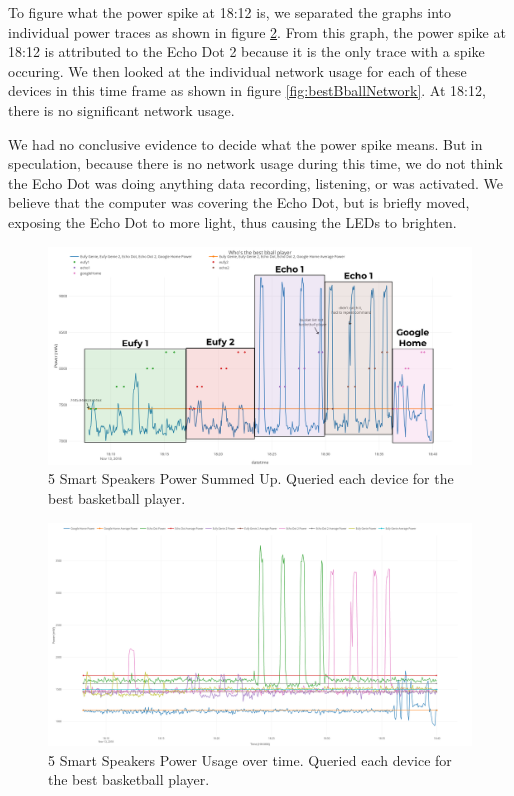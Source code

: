 To figure what the power spike at 18:12 is, we separated the graphs into individual power traces as shown in figure \ref{fig:bestBballSeperate}. From this graph, the power spike at 18:12 is attributed to the Echo Dot 2 because it is the only trace with a spike occuring. We then looked at the individual network usage for each of these devices in this time frame as shown in figure \ref{fig:bestBballNetwork}. At 18:12, there is no significant network usage.

We had no conclusive evidence to decide what the power spike means. But in speculation, because there is no network usage during this time, we do not think the Echo Dot was doing anything data recording, listening, or was activated. We believe that the computer was covering the Echo Dot, but is briefly moved, exposing the Echo Dot to more light, thus causing the LEDs to brighten.

\begin{figure}[H]
  \centering
  \includegraphics[width=1\textwidth]{figures/bestBballSum.png}
  \caption{5 Smart Speakers Power Summed Up. Queried each device for the
  best basketball player.}
  \label{fig:bestBballSum}
\end{figure}

\begin{figure}[H]
  \centering
  \includegraphics[width=1\textwidth]{figures/bestBballSeperate.png}
  \caption{5 Smart Speakers Power Usage over time. Queried each device for the
  best basketball player.}
  \label{fig:bestBballSeperate}
\end{figure}

